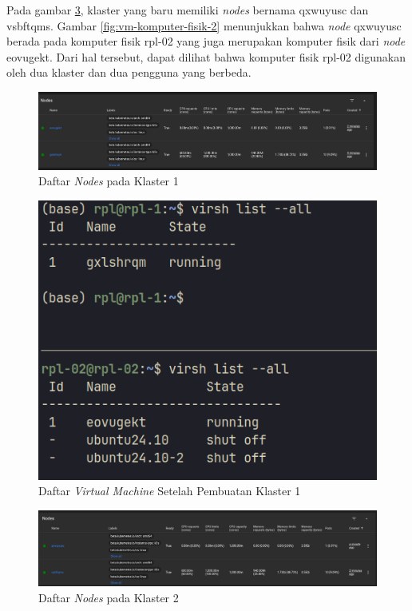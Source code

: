 Pada gambar \ref{fig:nodes-2-komputer-berbeda-2}, klaster yang baru
memiliki \emph{nodes} bernama qxwuyusc dan vsbftqms. Gambar \ref{fig:vm-komputer-fisik-2}
menunjukkan bahwa \emph{node} qxwuyusc berada pada komputer fisik rpl-02 yang juga
merupakan komputer fisik dari \emph{node} eovugekt. Dari hal tersebut, dapat
dilihat bahwa komputer fisik rpl-02 digunakan oleh dua klaster dan dua pengguna
yang berbeda.

\begin{figure}[H]
  \centering
  \includegraphics[scale=0.3]{gambar/two-nodes-difference-computer-dashboard.png}
  \caption{Daftar \emph{Nodes} pada Klaster 1}
  \label{fig:nodes-2-komputer-berbeda-1}
\end{figure}

\begin{figure}[H]
  \centering
  \includegraphics[scale=0.3]{gambar/ssh-nodes-list-1.png}
  \caption{Daftar \emph{Virtual Machine} Setelah Pembuatan Klaster 1}
  \label{fig:vm-komputer-fisik-1}
\end{figure}

\begin{figure}[H]
  \centering
  \includegraphics[scale=0.3]{gambar/two-nodes-difference-computer-dashboard-2.png}
  \caption{Daftar \emph{Nodes} pada Klaster 2}
  \label{fig:nodes-2-komputer-berbeda-2}
\end{figure}

